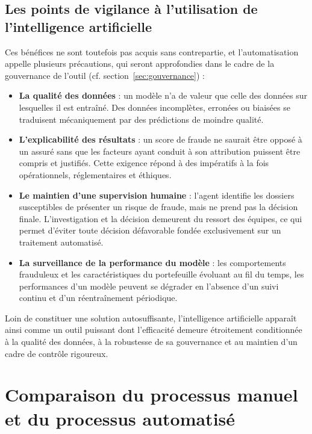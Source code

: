 \subsection{Les points de vigilance à l'utilisation de l'intelligence artificielle}

Ces bénéfices ne sont toutefois pas acquis sans contrepartie, et l'automatisation appelle plusieurs précautions, qui seront approfondies dans le cadre de la gouvernance de l'outil (cf. section~\ref{sec:gouvernance}) :

\begin{itemize}
    \item[$\bullet$] \textbf{La qualité des données} : un modèle n'a de valeur que celle des données sur lesquelles il est entraîné. Des données incomplètes, erronées ou biaisées se traduisent mécaniquement par des prédictions de moindre qualité.
    \item[$\bullet$] \textbf{L'explicabilité des résultats} : un score de fraude ne saurait être opposé à un assuré sans que les facteurs ayant conduit à son attribution puissent être compris et justifiés. Cette exigence répond à des impératifs à la fois opérationnels, réglementaires et éthiques.
    \item[$\bullet$] \textbf{Le maintien d'une supervision humaine} : l'agent identifie les dossiers susceptibles de présenter un risque de fraude, mais ne prend pas la décision finale. L'investigation et la décision demeurent du ressort des équipes, ce qui permet d'éviter toute décision défavorable fondée exclusivement sur un traitement automatisé.
    \item[$\bullet$] \textbf{La surveillance de la performance du modèle} : les comportements frauduleux et les caractéristiques du portefeuille évoluant au fil du temps, les performances d'un modèle peuvent se dégrader en l'absence d'un suivi continu et d'un réentraînement périodique.
\end{itemize}

Loin de constituer une solution autosuffisante, l'intelligence artificielle apparaît ainsi comme un outil puissant dont l'efficacité demeure étroitement conditionnée à la qualité des données, à la robustesse de sa gouvernance et au maintien d'un cadre de contrôle rigoureux.

\section{Comparaison du processus manuel et du processus automatisé}

